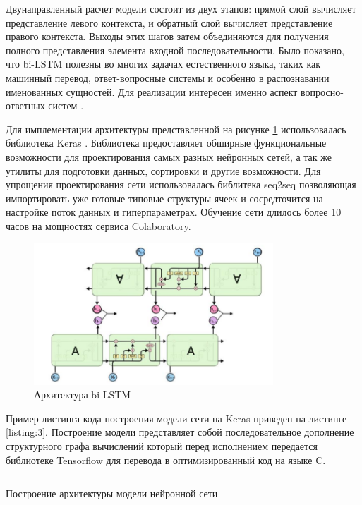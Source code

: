 Двунаправленный расчет модели состоит из двух этапов: прямой слой вычисляет представление левого контекста, и обратный слой вычисляет представление правого контекста. Выходы этих шагов затем объединяются для получения полного представления элемента входной последовательности. Было показано, что bi-LSTM полезны во многих задачах естественного языка, таких как машинный перевод, ответ-вопросные системы и особенно в распознавании именованных сущностей. Для реализации интересен именно аспект вопросно-ответных систем \cite{распознаваниесущностей}. 

Для имплементации архитектуры представленной на рисунке \ref{fig:lstm} использовалась библиотека Keras \cite{keras}. Библиотека предоставляет обширные функциональные возможности для проектирования самых разных нейронных сетей, а так же утилиты для подготовки данных, сортировки и другие возможности. Для упрощения проектирования сети использовалась библитека seq2seq \cite{Britz:2017} позволяющая импортировать уже готовые типовые структуры ячеек и сосредточится на настройке поток данных и гиперпараметрах. Обучение сети длилось более 10 часов на мощностях сервиса Colaboratory. 

\begin{figure}[H]
    \centering
    \includegraphics[width=0.8\textwidth]{image/bi-LSTM.png}
    \caption{Архитектура bi-LSTM}
    \label{fig:lstm}
\end{figure}

Пример листинга кода построения модели сети на Keras приведен на листинге \ref{listing:3}. Построение модели представляет собой последовательное дополнение структурного графа вычислений который перед исполнением передается библиотеке Tensorflow для перевода в оптимизированный код на языке C.  

\begin{listing}[H]
\inputminted[breaklines, breakanywhere, linenos, fontsize=\small]{python}{source/keras.py}
\caption{Построение архитектуры модели нейронной сети}
\label{listing:3}
\end{listing}


